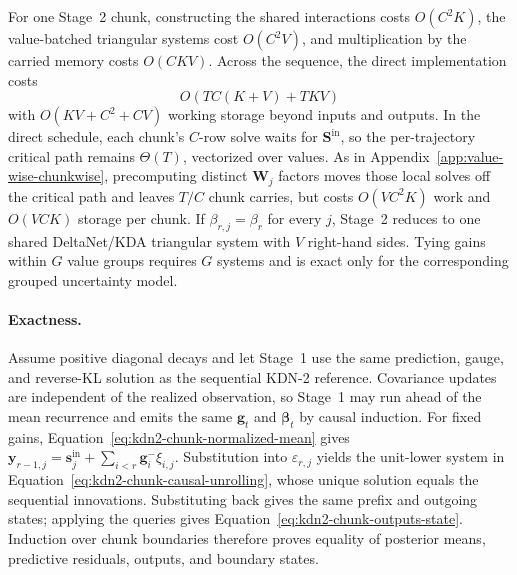 \documentclass[11pt]{article}
\newcommand{\ve}[1]{\boldsymbol{#1}}
\begin{document}
For one Stage~2 chunk, constructing the shared interactions costs $O(C^2K)$, the value-batched
triangular systems cost $O(C^2V)$, and multiplication by the carried memory costs $O(CKV)$.
Across the sequence, the direct implementation costs
\begin{equation}
  O\!\left(TC(K+V)+TKV\right)
  \label{eq:kdn2-chunk-mean-cost}
\end{equation}
with $O(KV+C^2+CV)$ working storage beyond inputs and outputs.  In the direct schedule, each
chunk's $C$-row solve waits for $\ve{S}^{\mathrm{in}}$, so the per-trajectory critical path remains
$\Theta(T)$, vectorized over values.  As in Appendix~\ref{app:value-wise-chunkwise}, precomputing
distinct $\ve{W}_j$ factors moves those local solves off the critical path and leaves $T/C$ chunk
carries, but costs $O(VC^2K)$ work and $O(VCK)$ storage per chunk.  If
$\beta_{r,j}=\beta_r$ for every $j$, Stage~2 reduces to one shared DeltaNet/KDA triangular system
with $V$ right-hand sides.  Tying gains within $G$ value groups requires $G$ systems and is exact
only for the corresponding grouped uncertainty model.

\paragraph{Exactness.}
Assume positive diagonal decays and let Stage~1 use the same prediction, gauge, and reverse-KL
solution as the sequential KDN-2 reference.  Covariance updates are independent of the realized
observation, so Stage~1 may run ahead of the mean recurrence and emits the same $\ve{g}_t$ and
$\ve{\beta}_t$ by causal induction.  For fixed gains,
Equation~\eqref{eq:kdn2-chunk-normalized-mean} gives
$\ve{y}_{r-1,j}=\ve{s}^{\mathrm{in}}_j+
\sum_{i<r}\ve{g}^{-}_i\xi_{i,j}$.  Substitution into $\varepsilon_{r,j}$ yields the unit-lower
system in Equation~\eqref{eq:kdn2-chunk-causal-unrolling}, whose unique solution equals the
sequential innovations.  Substituting back gives the same prefix and outgoing states; applying
the queries gives Equation~\eqref{eq:kdn2-chunk-outputs-state}.  Induction over chunk boundaries
therefore proves equality of posterior means, predictive residuals, outputs, and boundary states.
\end{document}
